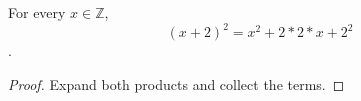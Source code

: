 \documentclass{article}
\begin{document}
{\newcommand{\offset}{2}
\begin{theorem}\label{shift-square}
For every $x\in\mathbb{Z}$, \[(x+\offset)^2=x^2+2*\offset*x+\offset^2\].
\end{theorem}
\begin{proof}Expand both products and collect the terms.\end{proof}}
\end{document}
